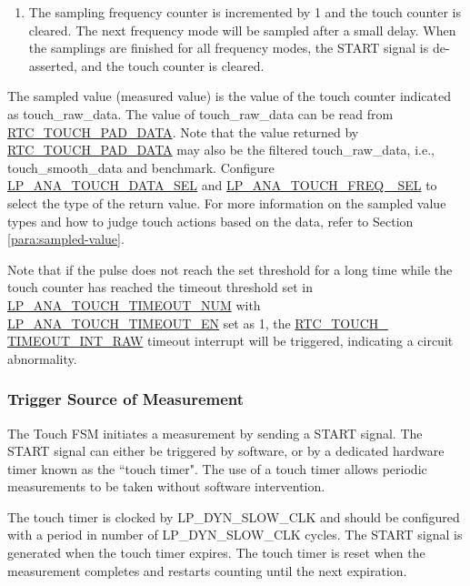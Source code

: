 \documentclass[main\_\_EN.tex]{subfiles}
\begin{document}
\begin{itemize}
\begin{enumerate}
            \item The sampling frequency counter is incremented by 1 and the touch counter is cleared. The next frequency mode will be sampled after a small delay. When the samplings are finished for all frequency modes, the START signal is de-asserted, and the touch counter is cleared. 
        \end{enumerate}
\end{itemize}

The sampled value (measured value) is the value of the touch counter indicated as touch\_raw\_data. The value of touch\_raw\_data can be read from \hyperref[fielddesc:RTCTOUCHPAD0DATA]{RTC\_TOUCH\_PAD\_DATA}. Note that the value returned by \hyperref[fielddesc:RTCTOUCHPAD0DATA]{RTC\_TOUCH\_PAD\_DATA} may also be the filtered touch\_raw\_data, i.e., touch\_smooth\_data and benchmark. Configure \hyperref[fielddesc:LPANATOUCHDATASEL]{LP\_ANA\_TOUCH\_DATA\_SEL} and \hyperref[fielddesc:LPANATOUCHFREQSEL]{LP\_ANA\_TOUCH\_FREQ \_SEL} to select the type of the return value. For more information on the sampled value types and how to judge touch actions based on the data, refer to Section \ref{para:sampled-value}.

\begin{tiplisting}
Note that if the pulse does not reach the set threshold for a long time while the touch counter has reached the timeout threshold set in \hyperref[fielddesc:LPANATOUCHTIMEOUTNUM]{LP\_ANA\_TOUCH\_TIMEOUT\_NUM} with \hyperref[fielddesc:LPANATOUCHTIMEOUTEN]{LP\_ANA\_TOUCH\_TIMEOUT\_EN} set as 1, the \hyperref[fielddesc:RTCTOUCHTIMEOUTINTRAW]{ RTC\_TOUCH\_\\TIMEOUT\_INT\_RAW} timeout interrupt will be triggered, indicating a circuit abnormality.
\end{tiplisting}

\subsubsection{Trigger Source of Measurement}

The Touch FSM initiates a measurement by sending a START signal. The START signal can either be triggered by software, or by a dedicated hardware timer known as the ``touch timer". The use of a touch timer allows periodic measurements to be taken without software intervention.

The touch timer is clocked by LP\_DYN\_SLOW\_CLK and should be configured with a period in number of LP\_DYN\_SLOW\_CLK cycles. The START signal is generated when the touch timer expires. The touch timer is reset when the measurement completes and restarts counting until the next expiration.
\end{document}
